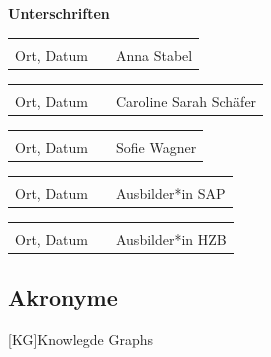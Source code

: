 \documentclass[12pt, oneside]{article}
\newcommand{\studentNameOne}{Anna Stabel}
\newcommand{\studentNameTwo}{Caroline Sarah Schäfer}
\newcommand{\studentNameThree}{Sofie Wagner}
\begin{document}
\newpage
\textbf{Unterschriften}
\newline

\begin{tabular}{lp{4em}l} 
 \hspace{5cm}   && \hspace{4cm} \\\cline{1-1}\cline{3-3} 
Ort, Datum     && \studentNameOne 
\end{tabular}

\begin{tabular}{lp{4em}l} 
 \hspace{5cm}   && \hspace{4cm} \\\cline{1-1}\cline{3-3} 
Ort, Datum     && \studentNameTwo
\end{tabular}

\begin{tabular}{lp{4em}l} 
 \hspace{5cm}   && \hspace{4cm} \\\cline{1-1}\cline{3-3} 
Ort, Datum     && \studentNameThree 
\end{tabular}

\begin{tabular}{lp{4em}l} 
 \hspace{5cm}   && \hspace{4cm} \\\cline{1-1}\cline{3-3} 
Ort, Datum     && Ausbilder*in SAP 
\end{tabular}

\begin{tabular}{lp{4em}l} 
 \hspace{5cm}   && \hspace{4cm} \\\cline{1-1}\cline{3-3} 
Ort, Datum     && Ausbilder*in HZB
\end{tabular}

\newpage


\tableofcontents
\newpage

\begin{acronym}[ECU]
\section*{Akronyme}

    [KG]{Knowlegde Graphs}

\end{acronym}
\end{document}
